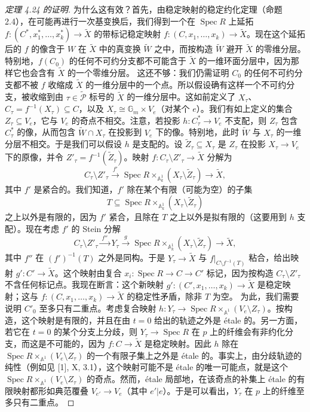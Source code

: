 \begin{proof}[定理 4.24 的证明]
为什么这有效？首先，由稳定映射的稳定约化定理（命题 2.4），在可能再进行一次基变换后，我们得到一个在 $\operatorname{Spec}R$ 上延拓 $f:(C^*,x^*_1,\dots,x^*_k)\to\widetilde X$ 的带标记稳定映射 $f:(C,x_1,\dots,x_k)\to\widetilde X$。现在这个延拓后的 $f$ 的像含于 $W$ 在 $\widetilde X$ 中的真变换 $\widetilde W$ 之中，而按构造 $\widetilde W$ 避开 $\widetilde X$ 的零维分层。特别地，$f(C_0)$ 的任何不可约分支都不可能含于 $\widetilde X$ 的一维环面分层中，因为那样它也会含有 $\widetilde X$ 的一个零维分层。
这还不够：我们仍需证明 $C_0$ 的任何不可约分支都不被 $f$ 收缩成 $\widetilde X$ 的一维分层中的一个点。所以假设确有这样一个不可约分支，被收缩到由 $\tau\in\widetilde{\mathcal P}$ 标号的 $\widetilde X$ 的一维分层中。这如前定义了 $X_\tau$、$C_\tau=f^{-1}(X_\tau)\subseteq C$，以及 $X_\tau\cong\mathbb{G}_m\times V_e$（对某个 $e$）。我们有如上定义的集合 $Z_\tau\subseteq V_e$，它与 $V_e$ 的奇点不相交。注意，若投影 $h:C^*_\tau\to V_e$ 不支配，则 $Z_\tau$ 包含 $C^*_\tau$ 的像，从而包含 $\widetilde W\cap X_\tau$ 在投影到 $V_e$ 下的像。特别地，此时 $\widetilde W$ 与 $X_\tau$ 的一维分层不相交。于是我们可以假设 $h$ 是支配的。设 $\widetilde Z_\tau\subseteq X_\tau$ 是 $Z_\tau$ 在投影 $X_\tau\to V_e$ 下的原像，并令 $Z'_\tau=f^{-1}(\widetilde Z_\tau)$。映射 $f:C_\tau\setminus Z'_\tau\to\widetilde X$ 分解为
\[
C_\tau\setminus Z'_\tau\xrightarrow{\ f'\ }\operatorname{Spec}R\times_{\mathbb{A}^1_k}(X_\tau\setminus\widetilde Z_\tau)\to\widetilde X,
\]
其中 $f'$ 是紧合的。我们知道，$f'$ 除在某个有限（可能为空）的子集
\[
T\subseteq\operatorname{Spec}R\times_{\mathbb{A}^1_k}(X_\tau\setminus\widetilde Z_\tau)
\]
之上以外是有限的，因为 $f'$ 紧合，且除在 $T$ 之上以外是拟有限的（这要用到 $h$ 支配）。现在考虑 $f'$ 的 Stein 分解
\[
C_\tau\setminus Z'_\tau\xrightarrow{\ f''\ }Y_\tau\xrightarrow{\ g\ }\operatorname{Spec}R\times_{\mathbb{A}^1_k}(X_\tau\setminus\widetilde Z_\tau)\to\widetilde X,
\]
其中 $f''$ 在 $(f')^{-1}(T)$ 之外是同构。于是 $Y_\tau\to\widetilde X$ 与 $f|_{C\setminus f^{-1}(T)}$ 粘合，给出映射 $g':C'\to\widetilde X$。这个映射由复合 $x_i:\operatorname{Spec}R\to C\to C'$ 标记，因为按构造 $C_\tau\setminus Z'_\tau$ 不含任何标记点。我现在断言：这个新映射 $g':(C',x_1,\dots,x_k)\to\widetilde X$ 是稳定映射；这与 $f:(C,x_1,\dots,x_k)\to\widetilde X$ 的稳定性矛盾，除非 $T$ 为空。
为此，我们需要说明 $C'_0$ 至多只有二重点。考虑复合映射 $h:Y_\tau\to\operatorname{Spec}R\times_{\mathbb{A}^1}(V_e\setminus Z_\tau)$。按构造，这个映射是有限的，并且在由 $t=0$ 给出的轨迹之外是 étale 的。另一方面，若它在 $t=0$ 的某个分支上分歧，则 $Y_\tau\to\operatorname{Spec}R$ 在 $p$ 上的纤维会有非约化分支，而这是不可能的，因为 $f:C\to\widetilde X$ 是稳定映射。因此 $h$ 除在 $\operatorname{Spec}R\times_{\mathbb{A}^1}(V_e\setminus Z_\tau)$ 的一个有限子集上之外是 étale 的。事实上，由分歧轨迹的纯性（例如见 [1], X, 3.1），这个映射可能不是 étale 的唯一可能点，就是这个 $\operatorname{Spec}R\times_{\mathbb{A}^1}(V_e\setminus Z_\tau)$ 的奇点。然而，étale 局部地，在该奇点的补集上 étale 的有限映射都形如典范覆叠 $V_{e'}\to V_e$（其中 $e'|e$）。于是可以看出，$Y_\tau$ 在 $p$ 上的纤维至多只有二重点。

\end{proof}
